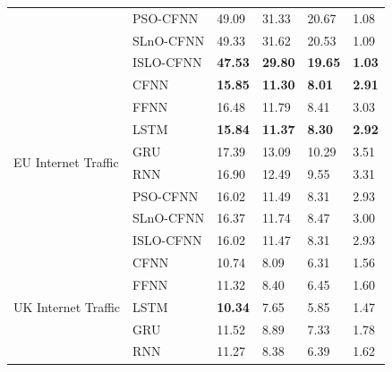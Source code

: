 \documentclass[a4paper,13pt,2p]{report}
\begin{document}
\begin{table}[!t]
\begin{tabular}{|l|l|l|l|l|l|}
                                     & PSO-CFNN  & 49.09           & 31.33           & 20.67          & 1.08          \\ \cline{2-6} 
                                     & SLnO-CFNN & 49.33           & 31.62           & 20.53          & 1.09          \\ \cline{2-6} 
                                     & ISLO-CFNN & \textbf{47.53}  & \textbf{29.80}  & \textbf{19.65} & \textbf{1.03} \\ \hline
\multirow{8}{*}{EU Internet Traffic} & CFNN      & \textbf{15.85}  & \textbf{11.30}  & \textbf{8.01}  & \textbf{2.91} \\ \cline{2-6} 
                                     & FFNN      & 16.48           & 11.79           & 8.41           & 3.03          \\ \cline{2-6} 
                                     & LSTM      & \textbf{15.84}  & \textbf{11.37}  & \textbf{8.30}  & \textbf{2.92} \\ \cline{2-6} 
                                     & GRU       & 17.39           & 13.09           & 10.29          & 3.51          \\ \cline{2-6} 
                                     & RNN       & 16.90           & 12.49           & 9.55           & 3.31          \\ \cline{2-6} 
                                     & PSO-CFNN  & 16.02           & 11.49           & 8.31           & 2.93          \\ \cline{2-6} 
                                     & SLnO-CFNN & 16.37           & 11.74           & 8.47           & 3.00          \\ \cline{2-6} 
                                     & ISLO-CFNN & 16.02           & 11.47           & 8.31           & 2.93          \\ \hline
\multirow{8}{*}{UK Internet Traffic} & CFNN      & 10.74           & 8.09            & 6.31           & 1.56          \\ \cline{2-6} 
                                     & FFNN      & 11.32           & 8.40            & 6.45           & 1.60          \\ \cline{2-6} 
                                     & LSTM      & \textbf{10.34}  & 7.65            & 5.85           & 1.47          \\ \cline{2-6} 
                                     & GRU       & 11.52           & 8.89            & 7.33           & 1.78          \\ \cline{2-6} 
                                     & RNN       & 11.27           & 8.38            & 6.39           & 1.62          \\ \cline{2-6} 

\end{tabular}
\end{table}
\end{document}
